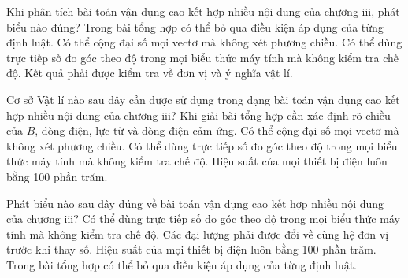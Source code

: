 \begin{ex}
Khi phân tích bài toán vận dụng cao kết hợp nhiều nội dung của chương iii, phát biểu nào đúng?
\choice
{Trong bài tổng hợp có thể bỏ qua điều kiện áp dụng của từng định luật.}
{Có thể cộng đại số mọi vectơ mà không xét phương chiều.}
{Có thể dùng trực tiếp số đo góc theo độ trong mọi biểu thức máy tính mà không kiểm tra chế độ.}
{\True Kết quả phải được kiểm tra về đơn vị và ý nghĩa vật lí.}
\end{ex}

\begin{ex}
Cơ sở Vật lí nào sau đây cần được sử dụng trong dạng bài toán vận dụng cao kết hợp nhiều nội dung của chương iii?
\choice
{\True Khi giải bài tổng hợp cần xác định rõ chiều của $B$, dòng điện, lực từ và dòng điện cảm ứng.}
{Có thể cộng đại số mọi vectơ mà không xét phương chiều.}
{Có thể dùng trực tiếp số đo góc theo độ trong mọi biểu thức máy tính mà không kiểm tra chế độ.}
{Hiệu suất của mọi thiết bị điện luôn bằng 100 phần trăm.}
\end{ex}

\begin{ex}
Phát biểu nào sau đây đúng về bài toán vận dụng cao kết hợp nhiều nội dung của chương iii?
\choice
{Có thể dùng trực tiếp số đo góc theo độ trong mọi biểu thức máy tính mà không kiểm tra chế độ.}
{\True Các đại lượng phải được đổi về cùng hệ đơn vị trước khi thay số.}
{Hiệu suất của mọi thiết bị điện luôn bằng 100 phần trăm.}
{Trong bài tổng hợp có thể bỏ qua điều kiện áp dụng của từng định luật.}
\end{ex}

